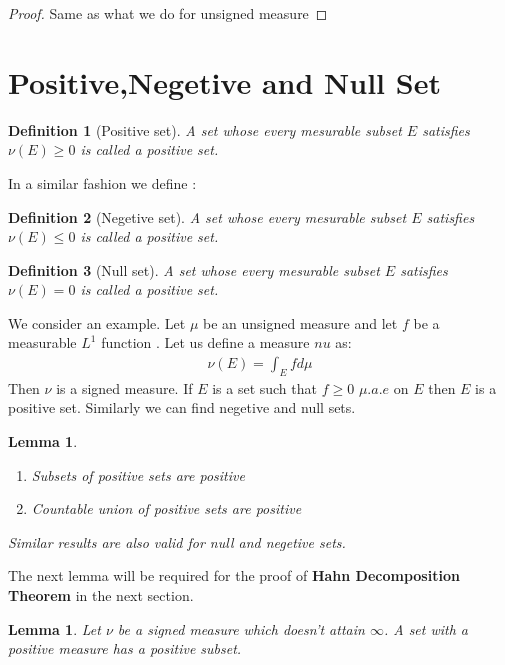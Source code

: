 \documentclass{tufte-book}
\newtheorem{defn}{Definition}
\newtheorem{lemma}[theorem]{Lemma}
\begin{document}
\begin{proof}
Same as what we do for unsigned measure
\end{proof}

\section{Positive,Negetive and Null Set}

\begin{defn}[Positive set]
	A set whose every mesurable subset $E$ satisfies $\nu(E)\geq0$ is called a positive set.
\end{defn}
\noindent In a similar fashion we define :

\begin{defn}[Negetive set]
	A set whose every mesurable subset $E$ satisfies $\nu(E)\leq0$ is called a positive set.
\end{defn}

\begin{defn}[Null set]
	A set whose every mesurable subset $E$ satisfies $\nu(E)=0$ is called a positive set.
\end{defn}

\noindent We consider an example. Let $\mu$ be an unsigned measure and let $f$ be a measurable $L^1$ function . Let us define a measure $nu$ as:
\begin{align}
	\nu(E)=\int_Efd\mu
\end{align}
Then $\nu$ is a signed measure. If $E$ is a set such that $f\geq0$ $\mu.a.e$ on $E$ then $E$ is a positive set. Similarly we can find negetive and null sets.

\begin{lemma}
	\begin{enumerate}
		\item Subsets of positive sets are positive
		\item Countable union of positive sets are positive
	\end{enumerate}
	Similar results are also valid for null and negetive sets.
\end{lemma}

\noindent The next lemma will be required for the proof of \textbf{Hahn Decomposition Theorem} in the next section.


\begin{lemma}
	Let $\nu$ be a signed measure which doesn't attain $\infty$. A set with a positive measure has a positive subset.
\end{lemma}
\end{document}
